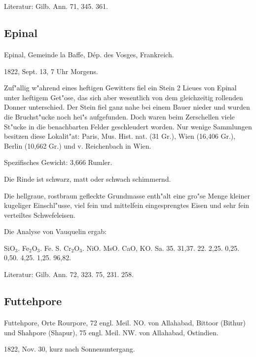 \documentclass[a4paper, 11pt, oneside]{article}
\begin{document}
Literatur: Gilb. Ann. 71, 345. 361.

\subsection{Epinal}
\normalsize
\paragraph{}
Epinal, Gemeinde la Baffe, Dép. des Vosges, Frankreich.

1822, Sept. 13, 7 Uhr Morgens.

Zuf"allig w"ahrend eines heftigen Gewitters fiel ein Stein 2 Lieues von Epinal unter heftigem Get"ose, das sich aber wesentlich von dem gleichzeitig rollenden Donner unterschied. Der Stein fiel ganz nahe bei einem Bauer nieder und wurden die Bruchst"ucke noch hei"s aufgefunden. Doch waren beim Zerschellen viele St"ucke in die benachbarten Felder geschleudert worden. Nur wenige Sammlungen besitzen diese Lokalit"at: Paris, Mus. Hist. nat. (31 Gr.), Wien (16,406 Gr.), Berlin (10,662 Gr.) und v. Reichenbach in Wien.

Spezifisches Gewicht: 3,666 Rumler.

Die Rinde ist schwarz, matt oder schwach schimmernd.

Die hellgraue, rostbraun gefleckte Grundmasse enth"alt eine gro"se Menge kleiner kugeliger Einschl"usse, viel fein und mittelfein eingesprengtes Eisen und sehr fein verteiltes Schwefeleisen.

Die Analyse von Vauquelin ergab:

SiO$_{3}$. Fe$_{2}$O$_{3}$. Fe. S. Cr$_{2}$O$_{3}$. NiO. MsO. CaO, KO. Sa.  
35. 31,37. 22. 2,25. 0,25. 0,50. 4,25. 1,25. 96,82.

Literatur: Gilb. Ann. 72, 323. 75, 231. 258.

\subsection{Futtehpore}
\normalsize
\paragraph{}
Futtehpore, Orte Rourpore, 72 engl. Meil. NO. von Allahabad, Bittoor (Bithur) und Shahpore (Shapur), 75 engl. Meil. NW. von Allahabad, Ostindien.

1822, Nov. 30, kurz nach Sonnenuntergang.
\end{document}
